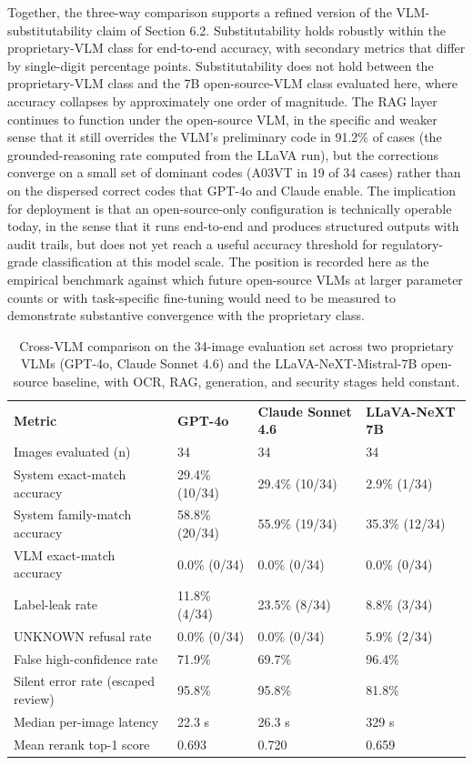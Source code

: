 Together, the three-way comparison supports a refined version of the VLM-substitutability claim of Section 6.2. Substitutability holds robustly within the proprietary-VLM class for end-to-end accuracy, with secondary metrics that differ by single-digit percentage points. Substitutability does not hold between the proprietary-VLM class and the 7B open-source-VLM class evaluated here, where accuracy collapses by approximately one order of magnitude. The RAG layer continues to function under the open-source VLM, in the specific and weaker sense that it still overrides the VLM's preliminary code in 91.2\% of cases (the grounded-reasoning rate computed from the LLaVA run), but the corrections converge on a small set of dominant codes (A03VT in 19 of 34 cases) rather than on the dispersed correct codes that GPT-4o and Claude enable. The implication for deployment is that an open-source-only configuration is technically operable today, in the sense that it runs end-to-end and produces structured outputs with audit trails, but does not yet reach a useful accuracy threshold for regulatory-grade classification at this model scale. The position is recorded here as the empirical benchmark against which future open-source VLMs at larger parameter counts or with task-specific fine-tuning would need to be measured to demonstrate substantive convergence with the proprietary class.

\begin{longtable}[]{@{}llll@{}}
\caption{Cross-VLM comparison on the 34-image evaluation set across two proprietary VLMs (GPT-4o, Claude Sonnet 4.6) and the LLaVA-NeXT-Mistral-7B open-source baseline, with OCR, RAG, generation, and security stages held constant.}\label{tab:cross-vlm}\\
\toprule
\endhead
\textbf{Metric} & \textbf{GPT-4o} & \textbf{Claude Sonnet 4.6} & \textbf{LLaVA-NeXT 7B}\tabularnewline
Images evaluated (n) & 34 & 34 & 34\tabularnewline
System exact-match accuracy & 29.4\% (10/34) & 29.4\% (10/34) & 2.9\% (1/34)\tabularnewline
System family-match accuracy & 58.8\% (20/34) & 55.9\% (19/34) & 35.3\% (12/34)\tabularnewline
VLM exact-match accuracy & 0.0\% (0/34) & 0.0\% (0/34) & 0.0\% (0/34)\tabularnewline
Label-leak rate & 11.8\% (4/34) & 23.5\% (8/34) & 8.8\% (3/34)\tabularnewline
UNKNOWN refusal rate & 0.0\% (0/34) & 0.0\% (0/34) & 5.9\% (2/34)\tabularnewline
False high-confidence rate & 71.9\% & 69.7\% & 96.4\%\tabularnewline
Silent error rate (escaped review) & 95.8\% & 95.8\% & 81.8\%\tabularnewline
Median per-image latency & 22.3 s & 26.3 s & 329 s\tabularnewline
Mean rerank top-1 score & 0.693 & 0.720 & 0.659\tabularnewline
\bottomrule
\end{longtable}


